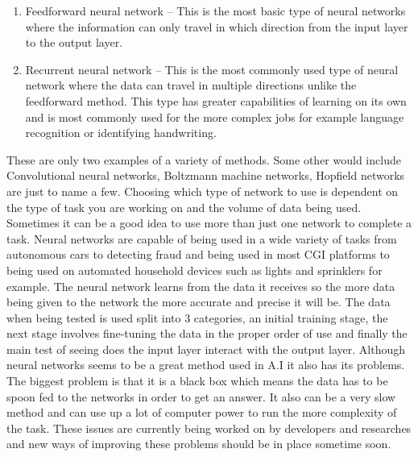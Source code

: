 \documentclass[letterpaper, 10 pt, conference]{ieeeconf}  %
\begin{document}
\begin{enumerate}
\item 
Feedforward neural network – This is the most basic type of neural networks where the information can only travel in which direction from the input layer to the output layer.
\item 
Recurrent neural network – This is the most commonly used type of neural network where the data can travel in multiple directions unlike the feedforward method. This type has greater capabilities of learning on its own and is most commonly used for the more complex jobs for example language recognition or identifying handwriting. 
\end{enumerate}


These are only two examples of a variety of methods. Some other would include Convolutional neural networks, Boltzmann machine networks, Hopfield networks are just to name a few. Choosing which type of network to use is dependent on the type of task you are working on and the volume of data being used. Sometimes it can be a good idea to use more than just one network to complete a task. 
Neural networks are capable of being used in a wide variety of tasks from autonomous cars to detecting fraud and being used in most CGI platforms to being used on automated household devices such as lights and sprinklers for example. The neural network learns from the data it receives so the more data being given to the network the more accurate and precise it will be. The data when being tested is used split into 3 categories, an initial training stage, the next stage involves fine-tuning the data in the proper order of use and finally the main test of seeing does the input layer interact with the output layer. Although neural networks seems to be a great method used in A.I it also has its problems. The biggest problem is that it is a black box which means the data has to be spoon fed to the networks in order to get an answer. It also can be a very slow method and can use up a lot of computer power to run the more complexity of the task. These issues are currently being worked on by developers and researches and new ways of improving these problems should be in place sometime soon. 
\end{document}
